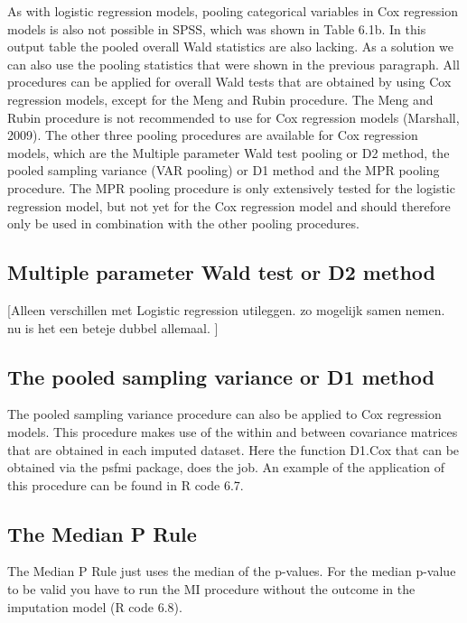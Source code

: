 \documentclass[]{book}
\theoremstyle{definition}
\theoremstyle{definition}
\theoremstyle{definition}
\theoremstyle{remark}
\begin{document}
As with logistic regression models, pooling categorical variables in Cox
regression models is also not possible in SPSS, which was shown in Table
6.1b. In this output table the pooled overall Wald statistics are also
lacking. As a solution we can also use the pooling statistics that were
shown in the previous paragraph. All procedures can be applied for
overall Wald tests that are obtained by using Cox regression models,
except for the Meng and Rubin procedure. The Meng and Rubin procedure is
not recommended to use for Cox regression models (Marshall, 2009). The
other three pooling procedures are available for Cox regression models,
which are the Multiple parameter Wald test pooling or D2 method, the
pooled sampling variance (VAR pooling) or D1 method and the MPR pooling
procedure. The MPR pooling procedure is only extensively tested for the
logistic regression model, but not yet for the Cox regression model and
should therefore only be used in combination with the other pooling
procedures.

\subsection{Multiple parameter Wald test or D2
method}\label{multiple-parameter-wald-test-or-d2-method-1}

{[}Alleen verschillen met Logistic regression utileggen. zo mogelijk
samen nemen. nu is het een beteje dubbel allemaal. {]}

\subsection{The pooled sampling variance or D1
method}\label{the-pooled-sampling-variance-or-d1-method-1}

The pooled sampling variance procedure can also be applied to Cox
regression models. This procedure makes use of the within and between
covariance matrices that are obtained in each imputed dataset. Here the
function D1.Cox that can be obtained via the psfmi package, does the
job. An example of the application of this procedure can be found in R
code 6.7.

\subsection{The Median P Rule}\label{the-median-p-rule-1}

The Median P Rule just uses the median of the p-values. For the median
p-value to be valid you have to run the MI procedure without the outcome
in the imputation model (R code 6.8).
\end{document}

